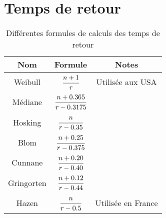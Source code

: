 \section{Temps de retour}
\begin{table}[H]
    \centering
    \begin{tabular}{ccc}
        \toprule
        \textbf{Nom} & \textbf{Formule}            & \textbf{Notes}     \\
        \toprule
        Weibull      & $\cfrac{n+1}{r}$            & Utilisée aux USA   \\
        \midrule
        Médiane      & $\cfrac{n+0.365}{r-0.3175}$ &                    \\
        \midrule
        Hosking      & $\cfrac{n}{r-0.35}$         &                    \\
        \midrule
        Blom         & $\cfrac{n+0.25}{r-0.375}$   &                    \\
        \midrule
        Cunnane      & $\cfrac{n+0.20}{r-0.40}$    &                    \\
        \midrule
        Gringorten   & $\cfrac{n+0.12}{r-0.44}$    &                    \\
        \arrayrulecolor{red} \midrule
        Hazen        & $\cfrac{n}{r-0.5}$          & Utilisée en France \\
        \bottomrule
    \end{tabular}
    \caption{Différentes formules de calculs des temps de retour}
    \label{tab:formuleTempsRetour}
\end{table}


